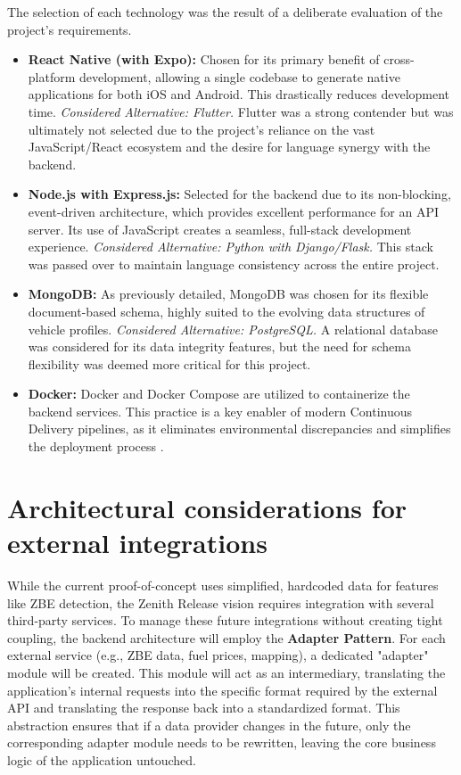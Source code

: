 The selection of each technology was the result of a deliberate evaluation of the project's requirements.
\begin{itemize}
    \item \textbf{React Native (with Expo):} Chosen for its primary benefit of cross-platform development, allowing a single codebase to generate native applications for both iOS and Android. This drastically reduces development time.
    \newline\textit{Considered Alternative: Flutter.} Flutter was a strong contender but was ultimately not selected due to the project's reliance on the vast JavaScript/React ecosystem and the desire for language synergy with the backend.
    \textgap
    \item \textbf{Node.js with Express.js:} Selected for the backend due to its non-blocking, event-driven architecture, which provides excellent performance for an API server. Its use of JavaScript creates a seamless, full-stack development experience.
    \newline\textit{Considered Alternative: Python with Django/Flask.} This stack was passed over to maintain language consistency across the entire project.
    \textgap
    \item \textbf{MongoDB:} As previously detailed, MongoDB was chosen for its flexible document-based schema, highly suited to the evolving data structures of vehicle profiles.
    \newline\textit{Considered Alternative: PostgreSQL.} A relational database was considered for its data integrity features, but the need for schema flexibility was deemed more critical for this project.
    \textgap
    \item \textbf{Docker:} Docker and Docker Compose are utilized to containerize the backend services. This practice is a key enabler of modern Continuous Delivery pipelines, as it eliminates environmental discrepancies and simplifies the deployment process \cite{Humble2010ContinuousDelivery}.
\end{itemize}

\section{Architectural considerations for external integrations}

While the current proof-of-concept uses simplified, hardcoded data for features like ZBE detection, the Zenith Release vision requires integration with several third-party services. To manage these future integrations without creating tight coupling, the backend architecture will employ the \textbf{Adapter Pattern}. For each external service (e.g., ZBE data, fuel prices, mapping), a dedicated "adapter" module will be created. This module will act as an intermediary, translating the application's internal requests into the specific format required by the external API and translating the response back into a standardized format. This abstraction ensures that if a data provider changes in the future, only the corresponding adapter module needs to be rewritten, leaving the core business logic of the application untouched.
